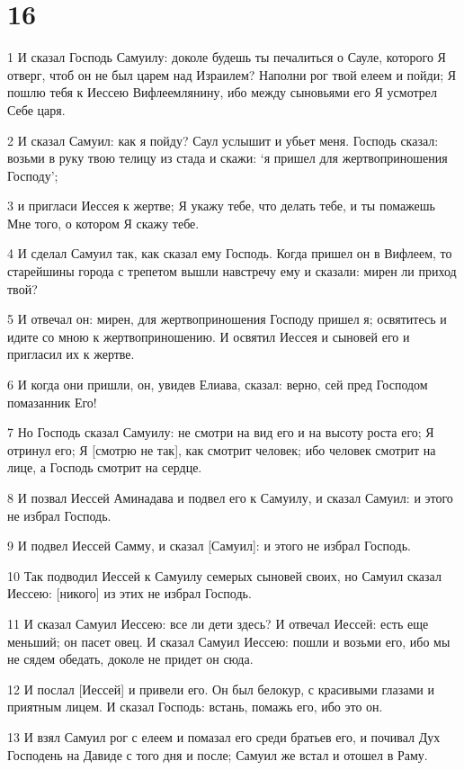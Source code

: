 \chapter{16}

\par 1 И сказал Господь Самуилу: доколе будешь ты печалиться о Сауле, которого Я отверг, чтоб он не был царем над Израилем? Наполни рог твой елеем и пойди; Я пошлю тебя к Иессею Вифлеемлянину, ибо между сыновьями его Я усмотрел Себе царя.
\par 2 И сказал Самуил: как я пойду? Саул услышит и убьет меня. Господь сказал: возьми в руку твою телицу из стада и скажи: `я пришел для жертвоприношения Господу';
\par 3 и пригласи Иессея к жертве; Я укажу тебе, что делать тебе, и ты помажешь Мне того, о котором Я скажу тебе.
\par 4 И сделал Самуил так, как сказал ему Господь. Когда пришел он в Вифлеем, то старейшины города с трепетом вышли навстречу ему и сказали: мирен ли приход твой?
\par 5 И отвечал он: мирен, для жертвоприношения Господу пришел я; освятитесь и идите со мною к жертвоприношению. И освятил Иессея и сыновей его и пригласил их к жертве.
\par 6 И когда они пришли, он, увидев Елиава, сказал: верно, сей пред Господом помазанник Его!
\par 7 Но Господь сказал Самуилу: не смотри на вид его и на высоту роста его; Я отринул его; Я [смотрю не так], как смотрит человек; ибо человек смотрит на лице, а Господь смотрит на сердце.
\par 8 И позвал Иессей Аминадава и подвел его к Самуилу, и сказал Самуил: и этого не избрал Господь.
\par 9 И подвел Иессей Самму, и сказал [Самуил]: и этого не избрал Господь.
\par 10 Так подводил Иессей к Самуилу семерых сыновей своих, но Самуил сказал Иессею: [никого] из этих не избрал Господь.
\par 11 И сказал Самуил Иессею: все ли дети здесь? И отвечал Иессей: есть еще меньший; он пасет овец. И сказал Самуил Иессею: пошли и возьми его, ибо мы не сядем обедать, доколе не придет он сюда.
\par 12 И послал [Иессей] и привели его. Он был белокур, с красивыми глазами и приятным лицем. И сказал Господь: встань, помажь его, ибо это он.
\par 13 И взял Самуил рог с елеем и помазал его среди братьев его, и почивал Дух Господень на Давиде с того дня и после; Самуил же встал и отошел в Раму.
